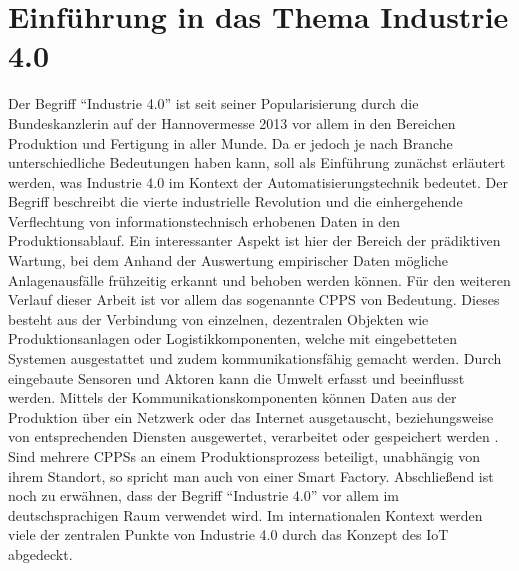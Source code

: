 \chapter{Einführung in das Thema Industrie 4.0}

Der Begriff "`Industrie 4.0"' ist seit seiner Popularisierung durch die Bundeskanzlerin auf der Hannovermesse 2013 vor allem in den Bereichen Produktion und Fertigung in aller Munde. Da er jedoch je nach Branche unterschiedliche Bedeutungen haben kann, soll als Einführung zunächst erläutert werden, was Industrie 4.0 im Kontext der Automatisierungstechnik bedeutet.
Der Begriff beschreibt die vierte industrielle Revolution und die einhergehende Verflechtung von informationstechnisch erhobenen Daten in den Produktionsablauf. Ein interessanter Aspekt ist hier der Bereich der prädiktiven Wartung, bei dem Anhand der Auswertung empirischer Daten mögliche Anlagenausfälle frühzeitig erkannt und behoben werden können.
Für den weiteren Verlauf dieser Arbeit ist vor allem das sogenannte \ac{CPPS} von Bedeutung. Dieses besteht aus der Verbindung von einzelnen, dezentralen Objekten wie Produktionsanlagen oder Logistikkomponenten, welche mit eingebetteten Systemen ausgestattet und zudem kommunikationsfähig gemacht werden. Durch eingebaute Sensoren und Aktoren kann die Umwelt erfasst und beeinflusst werden. Mittels der Kommunikationskomponenten können Daten aus der Produktion über ein Netzwerk oder das Internet ausgetauscht, beziehungsweise von entsprechenden Diensten ausgewertet, verarbeitet oder gespeichert werden
\cite{Bauerhansl2014}.
Sind mehrere \aclp{CPPS} an einem Produktionsprozess beteiligt, unabhängig von ihrem Standort, so spricht man auch von einer Smart Factory.
Abschließend ist noch zu erwähnen, dass der Begriff "`Industrie 4.0"' vor allem im deutschsprachigen Raum verwendet wird. Im internationalen Kontext werden viele der zentralen Punkte von Industrie 4.0 durch das Konzept des \ac{IoT} abgedeckt.
\clearpage




